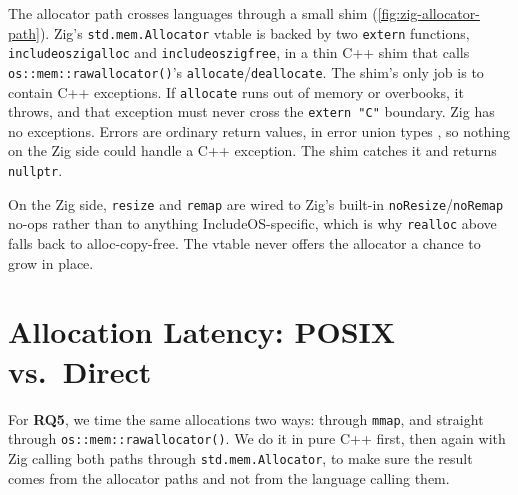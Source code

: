 \documentclass[12pt]{report}
\renewcommand{\_}{\origunderscore\allowbreak}
\begin{document}
The allocator path crosses languages through a small shim (\cref{fig:zig-allocator-path}). Zig's \texttt{std.mem.Allocator} vtable is backed by two \texttt{extern} functions, \texttt{includeos\_zig\_alloc} and \texttt{includeos\_zig\_free}, in a thin C++ shim that calls \texttt{os::\allowbreak mem::\allowbreak raw\_allocator()}'s \texttt{allocate}/\texttt{deallocate}. The shim's only job is to contain C++ exceptions. If \texttt{allocate} runs out of memory or overbooks, it throws, and that exception must never cross the \texttt{extern "C"} boundary. Zig has no exceptions. Errors are ordinary return values, in error union types \cite[Errors]{zig-langref}, so nothing on the Zig side could handle a C++ exception. The shim catches it and returns \texttt{nullptr}.

On the Zig side, \texttt{resize} and \texttt{remap} are wired to Zig's built-in \texttt{noResize}/\texttt{noRemap} no-ops rather than to anything IncludeOS-specific, which is why \texttt{realloc} above falls back to alloc-copy-free. The vtable never offers the allocator a chance to grow in place.

\section{Allocation Latency: POSIX vs.\ Direct}
\label{sec:eval-posix-direct}

For \textbf{RQ5}, we time the same allocations two ways: through \texttt{mmap}, and straight through \texttt{os::\allowbreak mem::\allowbreak raw\_allocator()}. We do it in pure C++ first, then again with Zig calling both paths through \texttt{std.mem.Allocator}, to make sure the result comes from the allocator paths and not from the language calling them.
\end{document}
